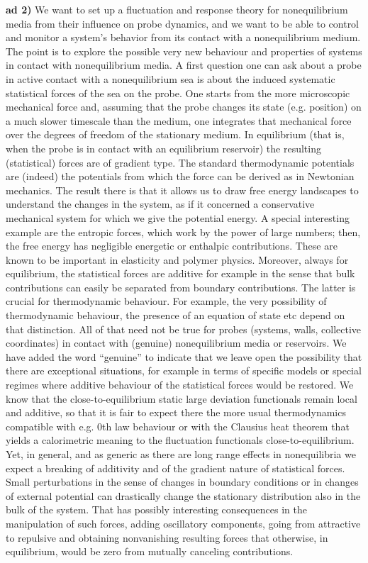{\bf ad 2)} We want to set up a fluctuation and response theory for nonequilibrium media from their influence on probe  dynamics, and we want to be able to control and monitor a system’s behavior from its contact with a nonequilibrium medium. The point is to explore the possible very new behaviour and properties of systems in contact with nonequilibrium media. A first question one can ask about a probe in active contact with a nonequilibrium sea is about the induced systematic statistical forces of the sea on the probe.  One starts from the more microscopic mechanical force and, assuming that the probe changes its state (e.g. position) on a much slower timescale than the medium, one integrates that mechanical force over the degrees of freedom of the stationary medium.  In equilibrium (that is, when the probe is in contact with an equilibrium reservoir) the resulting (statistical) forces are of gradient type.  The standard thermodynamic potentials are (indeed) the potentials from which the force can be derived as in Newtonian mechanics. The result there is that it allows us to draw free energy landscapes to understand the changes in the system, as if it concerned a conservative mechanical system for which we give the potential energy.  A special interesting example are the entropic forces, which work by the power of large numbers; then, the free energy has negligible energetic or enthalpic contributions.  These are known to be important in elasticity and polymer physics. Moreover, always for equilibrium, the statistical forces are additive for example in the sense that bulk contributions can easily be separated from boundary contributions.  The latter is crucial for thermodynamic behaviour.  For example, the very possibility of thermodynamic behaviour, the presence of an equation of state etc depend on that distinction.  All of that need not be true for probes (systems, walls, collective coordinates) in contact with (genuine) nonequilibrium media or reservoirs.  We have added the word “genuine” to indicate that we leave open the possibility that there are exceptional situations, for example in terms of specific models or special regimes where additive behaviour of the statistical forces would be restored.  We know that the close-to-equilibrium static large deviation functionals remain local and additive, so that it is fair to expect there the more usual thermodynamics compatible with e.g. 0th law behaviour or with the Clausius heat theorem that yields a calorimetric meaning to the fluctuation functionals close-to-equilibrium.   Yet, in general, and as generic as there are long range effects in nonequilibria we expect a breaking of additivity and of the gradient nature of statistical forces. Small perturbations in the sense of changes in boundary conditions or in changes of external potential can drastically change the stationary distribution also in the bulk of the system.  That has possibly interesting consequences in the manipulation of such forces, adding oscillatory components, going from attractive to repulsive and obtaining nonvanishing resulting forces that otherwise, in equilibrium, would be zero from mutually canceling contributions. 
